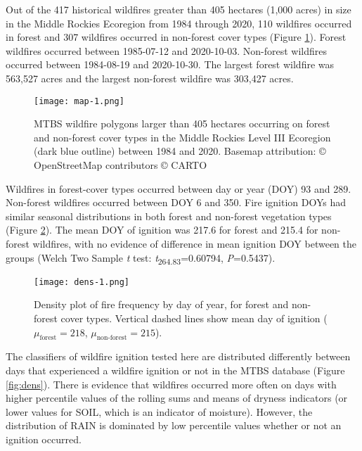 \documentclass[11p]{article}
\begin{document}
Out of the 417 historical wildfires greater than 405 hectares (1,000 acres) in size in the Middle Rockies Ecoregion from 1984 through 2020, 110 wildfires occurred in forest and 307 wildfires occurred in non-forest cover types (Figure \ref{fig:map}). Forest wildfires occurred between 1985-07-12 and 2020-10-03. Non-forest wildfires occurred between 1984-08-19 and 2020-10-30. The largest forest wildfire was 563,527 acres and the largest non-forest wildfire was 303,427 acres.

\begin{figure}[htbp]
  \texttt{[image: map-1.png]}
  \caption{MTBS wildfire polygons larger than 405 hectares occurring on forest and non-forest cover types in the Middle Rockies Level III Ecoregion (dark blue outline) between 1984 and 2020. Basemap attribution: © OpenStreetMap contributors © CARTO}
  \label{fig:map}
\end{figure}

Wildfires in forest-cover types occurred between day or year (DOY) 93 and 289. Non-forest wildfires occurred between DOY 6 and 350. Fire ignition DOYs had similar seasonal distributions in both forest and non-forest vegetation types (Figure \ref{fig:fire-dens}). The mean DOY of ignition was 217.6 for forest and 215.4 for non-forest wildfires, with no evidence of difference in mean ignition DOY between the groups (Welch Two Sample \textit{t} test: \textit{t}\textsubscript{264.83}=0.60794, \textit{P}=0.5437).

\begin{figure}[htbp]
  \texttt{[image: dens-1.png]}
  \caption{Density plot of fire frequency by day of year, for forest and non-forest cover types. Vertical dashed lines show mean day of ignition ($\mu_{\text{forest}} = 218$, $\mu_{\text{non-forest}} = 215$).}
  \label{fig:fire-dens}
\end{figure}

The classifiers of wildfire ignition tested here are distributed differently between days that experienced a wildfire ignition or not in the MTBS database (Figure \ref{fig:dens}). There is evidence that wildfires occurred more often on days with higher percentile values of the rolling sums and means of dryness indicators (or lower values for SOIL, which is an indicator of moisture). However, the distribution of RAIN is dominated by low percentile values whether or not an ignition occurred.  
\end{document}
